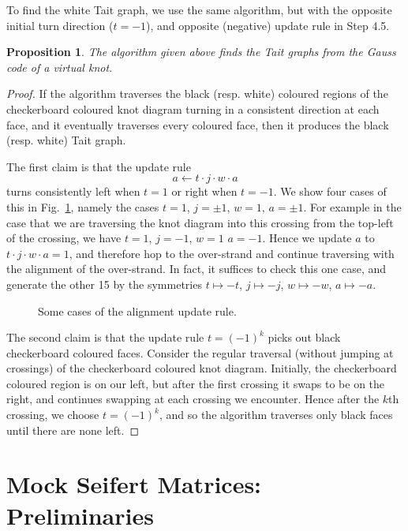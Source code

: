 \documentclass[12pt]{report}
\newtheorem*{proposition}{Proposition}
\theoremstyle{upright}
\begin{document}
To find the white Tait graph, we use the same algorithm, but with the opposite initial turn direction ($t = -1$), and opposite (negative) update rule in Step 4.5.

\begin{proposition}
	The algorithm given above finds the Tait graphs from the Gauss code of a virtual knot.
\end{proposition}

\begin{proof}
	If the algorithm traverses the black (resp. white) coloured regions of the checkerboard coloured knot diagram turning in a consistent direction at each face, and it eventually traverses every coloured face, then it produces the black (resp. white) Tait graph.
	
	The first claim is that the update rule
	\[a \leftarrow t \cdot j \cdot w \cdot a\]
	turns consistently left when $t = 1$ or right when $t = -1$. We show four cases of this in Fig.~\ref{fig:alignment-update-rule}, namely the cases $t = 1$, $j = \pm 1$, $w = 1$, $a = \pm 1$. For example in the case that we are traversing the knot diagram into this crossing from the top-left of the crossing, we have $t = 1$,  $j = -1$, $w = 1$ $a = -1$. Hence we update $a$ to $t \cdot j \cdot w \cdot a = 1$, and therefore hop to the over-strand and continue traversing with the alignment of the over-strand. In fact, it suffices to check this one case, and generate the other 15 by the symmetries $t \mapsto -t$, $j \mapsto -j$, $w \mapsto -w$, $a \mapsto -a$.
	
	\begin{figure}[hbt!]
		\centering
		\def\svgscale{0.3}
		
		
		\caption{Some cases of the alignment update rule.}
		\label{fig:alignment-update-rule}
	\end{figure}
	
	The second claim is that the update rule $t = (-1)^{k}$ picks out black checkerboard coloured faces. Consider the regular traversal (without jumping at crossings) of the checkerboard coloured knot diagram. Initially, the checkerboard coloured region is on our left, but after the first crossing it swaps to be on the right, and continues swapping at each crossing we encounter. Hence after the $k$th crossing, we choose $t = (-1)^{k}$, and so the algorithm traverses only black faces until there are none left. 
\end{proof}

\section{Mock Seifert Matrices: Preliminaries}
\end{document}
